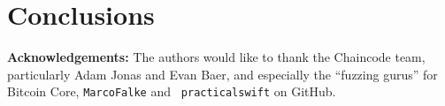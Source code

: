\section{Conclusions}

\begin{sloppypar}
{\bf Acknowledgements:} The authors would like to thank the Chaincode
team, particularly Adam Jonas and Evan Baer, and especially the
``fuzzing gurus'' for Bitcoin Core, {\tt MarcoFalke} and {\tt
  practicalswift} on GitHub.
\end{sloppypar}